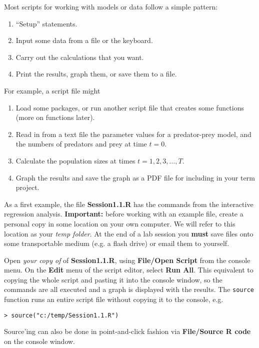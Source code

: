 \documentclass [11pt]{article}
\newcommand{\blst}{\vspace{-0.035in} \begin{lstlisting}}
\numberwithin{exercise}{section}
\begin{document}
Most scripts for working with models or data follow a simple pattern:
\begin{enumerate}
\item ``Setup'' statements.
\item Input some data from a file or the keyboard.
\item Carry out the calculations that you want.
\item Print the results, graph them, or save them to a file. 
\end{enumerate}

For example, a script file might
\begin{enumerate}
\item Load some packages, or run another script file that 
creates some functions (more on functions later). 
\item Read in from a text file the parameter values for a predator-prey model, and
the numbers of predators and prey at time $t=0$.
\item Calculate the population sizes at times $t=1,2,3,\ldots,T$.
\item Graph the results and save the graph as a PDF file for including
in your term project. 
\end{enumerate}
As a first example, the file \textbf{Session1.1.R} has the commands from the interactive 
regression analysis. \textbf{Important:} before working with an example file, create 
a personal copy in some location on your own computer. We will refer to this location
as your \textit{temp folder}. At the end of a lab session 
you \textbf{must} save files onto some transportable medium (e.g. a flash drive) 
or email them to yourself.  

Open \textit{your copy of} of \textbf{Session1.1.R}, using \textbf{File/Open Script}
from the console menu. On the \textbf{Edit} menu of the script editor,
select \textbf{Run All}. This equivalent to copying the
whole script and pasting it into the console window, so the commands are all 
executed and a graph is displayed with the results. The \texttt{source} function  
runs an entire script file without copying it to the console, e.g. 
\blst
> source("c:/temp/Session1.1.R")
\end{lstlisting}
Source'ing can also be done in point-and-click fashion 
via \textbf{File/Source R code} on the console window. 
\end{document}
